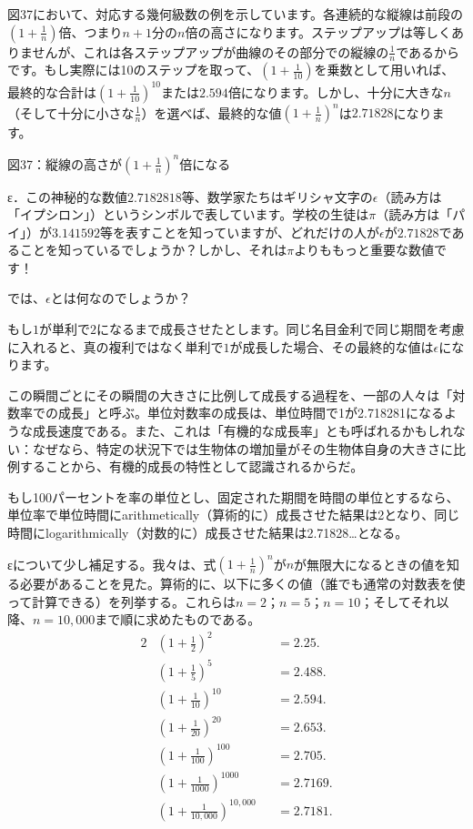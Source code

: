 \documentclass[a4paper,11pt,openany]{ltjsbook}
\begin{document}
図37において、対応する幾何級数の例を示しています。各連続的な縦線は前段の$\left(1 + \frac{1}{n}\right)$倍、つまり$n+1$分の$n$倍の高さになります。ステップアップは等しくありませんが、これは各ステップアップが曲線のその部分での縦線の$\frac{1}{n}$であるからです。もし実際には10のステップを取って、$\left(1 + \frac{1}{10}\right)$を乗数として用いれば、最終的な合計は$(1 + \frac{1}{10})^{10}$または$2.594$倍になります。しかし、十分に大きな$n$（そして十分に小さな$\frac{1}{n}$）を選べば、最終的な値$\left(1 + \frac{1}{n}\right)^n$は$2.71828$になります。

図37：縦線の高さが$(1 + \frac{1}{n})^n$倍になる

ε．この神秘的な数値$2.7182818$等、数学家たちはギリシャ文字の$\epsilon$（読み方は「イプシロン」）というシンボルで表しています。学校の生徒は$\pi$（読み方は「パイ」）が$3.141592$等を表すことを知っていますが、どれだけの人が$\epsilon$が$2.71828$であることを知っているでしょうか？しかし、それは$\pi$よりももっと重要な数値です！

では、$\epsilon$とは何なのでしょうか？

もし$1$が単利で$2$になるまで成長させたとします。同じ名目金利で同じ期間を考慮に入れると、真の複利ではなく単利で$1$が成長した場合、その最終的な値は$\epsilon$になります。

この瞬間ごとにその瞬間の大きさに比例して成長する過程を、一部の人々は「対数率での成長」と呼ぶ。単位対数率の成長は、単位時間で1が2.718281になるような成長速度である。また、これは「有機的な成長率」とも呼ばれるかもしれない：なぜなら、特定の状況下では生物体の増加量がその生物体自身の大きさに比例することから、有機的成長の特性として認識されるからだ。

もし100パーセントを率の単位とし、固定された期間を時間の単位とするなら、単位率で単位時間にarithmetically（算術的に）成長させた結果は2となり、同じ時間にlogarithmically（対数的に）成長させた結果は2.71828…となる。

εについて少し補足する。我々は、式$\left(1 + \frac{1}{n}\right)^n$が$n$が無限大になるときの値を知る必要があることを見た。算術的に、以下に多くの値（誰でも通常の対数表を使って計算できる）を列挙する。これらは$n = 2$；$n = 5$；$n = 10$；そしてそれ以降、$n = 10,000$まで順に求めたものである。
\begin{alignat*}{2}
&(1 + \frac{1}{2})^2             &&= 2.25.    \\
&(1 + \frac{1}{5})^5             &&= 2.488.   \\
&(1 + \frac{1}{10})^{10}         &&= 2.594.   \\
&(1 + \frac{1}{20})^{20}         &&= 2.653.   \\
&(1 + \frac{1}{100})^{100}       &&= 2.705.   \\
&(1 + \frac{1}{1000})^{1000}     &&= 2.7169.  \\
&(1 + \frac{1}{10,000})^{10,000} &&= 2.7181.
\end{alignat*}
\end{document}
